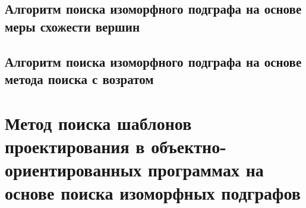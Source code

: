 \subsection{Алгоритм поиска изоморфного подграфа на основе меры схожести вершин}

\cite{SimilarityGraphVertices}

\subsection{Алгоритм поиска изоморфного подграфа на основе метода поиска с возратом}

\cite{SubgraphIsomorphism}

\section{Метод поиска шаблонов проектирования в объектно-ориентированных программах на основе поиска изоморфных подграфов}


